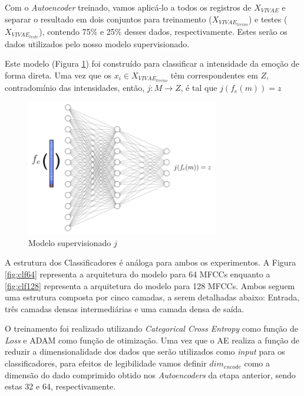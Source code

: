 Com o \textit{Autoencoder} treinado, vamos aplicá-lo a todos os registros de $X_{VIVAE}$ e separar o resultado em dois conjuntos para treinamento ($X_{VIVAE_{treino}}$) e testes ($X_{VIVAE_{teste}}$), contendo 75\% e 25\% desses dados, respectivamente. Estes serão os dados utilizados pelo nosso modelo supervisionado.


Este modelo (Figura \ref{fig:jsupervisionado}) foi construído para classificar a intensidade da emoção de forma direta. Uma vez que os $x_i \in X_{VIVAE_{treino}}$ têm correspondentes em $Z$, contradomínio das intensidades, então, $j: M \rightarrow Z$, é tal que $j(f_e(m)) = z$

\begin{figure}[h]
    \centering
    \includegraphics[width=0.75\textwidth]{img/p-supervisionado.png}
    \caption{\label{fig:jsupervisionado}Modelo supervisionado $j$}
\end{figure}


A estrutura dos Classificadores é análoga para ambos os experimentos. A Figura \ref{fig:clf64} representa a arquitetura do modelo para 64 \acrshort{MFCC}s enquanto a \ref{fig:clf128} representa a arquitetura do modelo para 128 \acrshort{MFCC}s. Ambos seguem uma estrutura composta por cinco camadas, a serem detalhadas abaixo: Entrada, três camadas densas intermediárias e uma camada densa de saída.

O treinamento foi realizado utilizando \textit{Categorical Cross Entropy} como função de \textit{Loss} e \acrshort{ADAM} como função de otimização. Uma vez que o \acrshort{AE} realiza a função de reduzir a dimensionalidade dos dados que serão utilizados como \textit{input} para os classificadores, para efeitos de legibilidade vamos definir $dim_{encode}$ como a dimensão do dado comprimido obtido nos \textit{Autoencoders} da etapa anterior, sendo estas 32 e 64, respectivamente.


